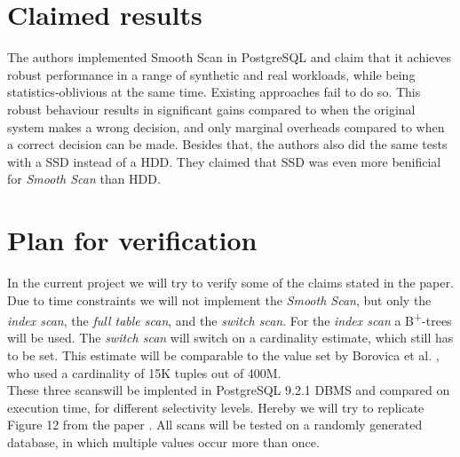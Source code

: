 \documentclass[a4paper,11pt,titlepage]{article}
\begin{document}
\section{Claimed results}
The authors implemented Smooth Scan in PostgreSQL and claim that it achieves robust performance in a range of synthetic and real workloads, while being statistics-oblivious at the same time. Existing approaches fail to do so. This robust behaviour results in significant gains compared to when the original system makes a wrong decision, and only marginal overheads compared to when a correct decision can be made. Besides that, the authors also did the same tests with a SSD instead of a HDD. They claimed that SSD was even more benificial for \emph{Smooth Scan} than HDD.

\section{Plan for verification}
In the current project we will try to verify some of the claims stated in the paper.
Due to time constraints we will not implement the \emph{Smooth Scan}, but only the \emph{index scan}, the \emph{full table scan}, and the \emph{switch scan}.
For the \emph{index scan} a B\textsuperscript{+}-trees will be used. The \emph{switch scan}  will switch on a cardinality estimate, which still has to be set. This estimate will be comparable to the value set by Borovica et al. \cite{smoothscan}, who used a cardinality of 15K tuples out of 400M.
\\
These three scanswill be implented in PostgreSQL 9.2.1 DBMS and compared on execution time, for different selectivity levels.
Hereby we will try to replicate Figure 12 from the paper \cite{smoothscan}.
All scans will be tested on a randomly generated database, in which multiple values occur more than once.

\end{document}
